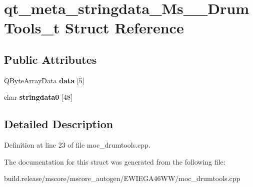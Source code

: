\hypertarget{structqt__meta__stringdata___ms_____drum_tools__t}{}\section{qt\+\_\+meta\+\_\+stringdata\+\_\+\+Ms\+\_\+\+\_\+\+Drum\+Tools\+\_\+t Struct Reference}
\label{structqt__meta__stringdata___ms_____drum_tools__t}
\subsection*{Public Attributes}
\begin{DoxyCompactItemize}
\item 
\mbox{\label{structqt__meta__stringdata___ms_____drum_tools__t_ac7760ca9abc3930e47b3138a5f412ff7}} 
Q\+Byte\+Array\+Data {\bfseries data} \mbox{[}5\mbox{]}
\item 
\mbox{\label{structqt__meta__stringdata___ms_____drum_tools__t_a189c8d8a06198906bd712675c32a2c1c}} 
char {\bfseries stringdata0} \mbox{[}48\mbox{]}
\end{DoxyCompactItemize}


\subsection{Detailed Description}


Definition at line 23 of file moc\+\_\+drumtools.\+cpp.



The documentation for this struct was generated from the following file\+:\begin{DoxyCompactItemize}
\item 
build.\+release/mscore/mscore\+\_\+autogen/\+E\+W\+I\+E\+G\+A46\+W\+W/moc\+\_\+drumtools.\+cpp\end{DoxyCompactItemize}
